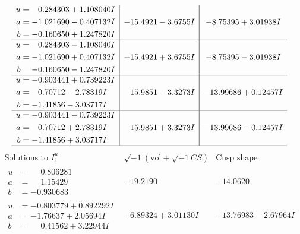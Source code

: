 \documentclass[1p]{elsarticle_modified}
\theoremstyle{definition}
\newcommand{\I}{\sqrt{-1}}
\begin{document}
$$\begin{array}{c|c|c}
\begin{aligned}
u &= \phantom{-}0.284303 + 1.108040 I \\
a &= -1.021690 - 0.407132 I \\
b &= -0.160650 + 1.247820 I\end{aligned}
 & -15.4921 - 3.6755 I & -8.75395 + 3.01938 I \\ \hline\begin{aligned}
u &= \phantom{-}0.284303 - 1.108040 I \\
a &= -1.021690 + 0.407132 I \\
b &= -0.160650 - 1.247820 I\end{aligned}
 & -15.4921 + 3.6755 I & -8.75395 - 3.01938 I \\ \hline\begin{aligned}
u &= -0.903441 + 0.739223 I \\
a &= \phantom{-}0.70712 - 2.78319 I \\
b &= -1.41856 - 3.03717 I\end{aligned}
 & \phantom{-}15.9851 - 3.3273 I & -13.99686 + 0.12457 I \\ \hline\begin{aligned}
u &= -0.903441 - 0.739223 I \\
a &= \phantom{-}0.70712 + 2.78319 I \\
b &= -1.41856 + 3.03717 I\end{aligned}
 & \phantom{-}15.9851 + 3.3273 I & -13.99686 - 0.12457 I\\
 \hline 
 \end{array}$$\newpage$$\begin{array}{c|c|c}  
\text{Solutions to }I^u_{1}& \I (\text{vol} + \sqrt{-1}CS) & \text{Cusp shape}\\
 \hline 
\begin{aligned}
u &= \phantom{-}0.806281\phantom{ +0.000000I} \\
a &= \phantom{-}1.15429\phantom{ +0.000000I} \\
b &= -0.930683\phantom{ +0.000000I}\end{aligned}
 & -19.2190\phantom{ +0.000000I} & -14.0620\phantom{ +0.000000I} \\ \hline\begin{aligned}
u &= -0.803779 + 0.892292 I \\
a &= -1.76637 + 2.05694 I \\
b &= \phantom{-}0.41562 + 3.22944 I\end{aligned}
 & -6.89324 + 3.01130 I & -13.76983 - 2.67964 I \\ \hline\begin{aligned}

\end{aligned}
\end{array}$$
\end{document}
